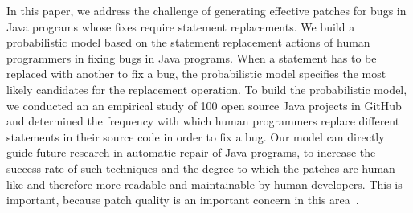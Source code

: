 In this paper, we address the challenge of generating effective patches for bugs in Java programs whose fixes require statement replacements. We build a probabilistic model based on the statement replacement actions of human programmers in fixing bugs in Java programs. When a statement has to be replaced with another to fix a bug, the probabilistic model specifies the most likely candidates for the replacement operation. To build the probabilistic model, we conducted an an empirical study of 100 open source Java projects in GitHub and determined the frequency with which human programmers replace different statements in their source code in order to fix a bug. Our model can directly guide future research in automatic repair of Java programs, to increase the success rate of such techniques and the degree to which the patches are human-like and therefore more readable and maintainable by human developers. This is important, because patch quality is an important
concern in this area~\cite{Qi15}.


